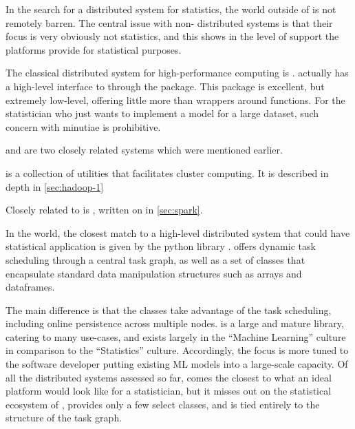 In the search for a distributed system for statistics, the world outside of \R{} is not remotely barren.
The central issue with non-\R{} distributed systems is that their focus is very obviously not statistics, and this shows in the level of support the platforms provide for statistical purposes.

The classical distributed system for high-performance computing is .
\R{} actually has a high-level interface to  through the 
package.
This package is excellent, but extremely low-level, offering little more than wrappers around  functions.
For the statistician who just wants to implement a model for a large dataset, such concern with minutiae is prohibitive.

 and  are two closely related systems which were mentioned
earlier.

 is a collection of utilities that facilitates cluster computing.
It is described in depth in \cref{sec:hadoop-1}

Closely related to  is , written on in \cref{sec:spark}.

In the  world, the closest match to a high-level distributed system that could have statistical application is given by the python library \cite{rocklin2015dask}.
 offers
dynamic task scheduling through a central task graph, as well as a set
of classes that encapsulate standard data manipulation structures such
as  arrays and  dataframes.

The main difference is that the  classes take advantage of the task scheduling, including online persistence across multiple nodes.
 is a large and mature library, catering to many use-cases,
and exists largely in the  ``Machine Learning'' culture in
comparison to the \R{} ``Statistics'' culture.
Accordingly, the focus is more tuned to the  software developer putting existing ML models into a large-scale capacity.
Of all the distributed systems assessed so far,  comes the closest to what an ideal platform would look like for a statistician, but it misses out on the statistical ecosystem of \R{}, provides only a few select classes, and is tied entirely to the structure of the task graph.
